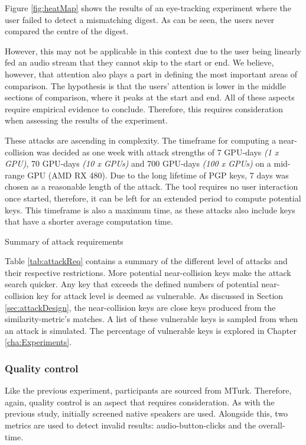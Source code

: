 Figure \ref{fig:heatMap} shows the results of an eye-tracking experiment where the user failed to detect a mismatching digest. As can be seen, the users never compared the centre of the digest. 

However, this may not be applicable in this context due to the user being linearly fed an audio stream that they cannot skip to the start or end. We believe, however, that attention also plays a part in defining the most important areas of comparison. The hypothesis is that the users' attention is lower in the middle sections of comparison, where it peaks at the start and end. All of these aspects require empirical evidence to conclude. Therefore, this requires consideration when assessing the results of the experiment.

These attacks are ascending in complexity. The timeframe for computing a near-collision was decided as one week with attack strengths of 7 GPU-days \textit{(1 x GPU)}, 70 GPU-days \textit{(10 x GPUs)} and 700 GPU-days \textit{(100 x GPUs)} on a mid-range GPU (AMD RX 480). Due to the long lifetime of PGP keys, 7 days was chosen as a reasonable length of the attack. The tool requires no user interaction once started, therefore, it can be left for an extended period to compute potential keys. This timeframe is also a maximum time, as these attacks also include keys that have a shorter average computation time.

\begin{table}[h!]
    \centering
    
    \caption{Summary of attack requirements}
    \label{tab:attackReq}
\end{table}

Table \ref{tab:attackReq} contains a summary of the different level of attacks and their respective restrictions. More potential near-collision keys make the attack search quicker. Any key that exceeds the defined numbers of potential near-collision key for attack level is deemed as vulnerable.  As discussed in Section \ref{sec:attackDesign}, the near-collision keys are close keys produced from the similarity-metric's matches. A list of these vulnerable keys is sampled from when an attack is simulated. The percentage of vulnerable keys is explored in Chapter \ref{cha:Experiments}.

\subsubsection{Quality control}
\label{sec:exp2_quality}
Like the previous experiment, participants are sourced from MTurk. Therefore, again, quality control is an aspect that requires consideration. As with the previous study, initially screened native speakers are used. Alongside this, two metrics are used to detect invalid results: audio-button-clicks and the overall-time. 

